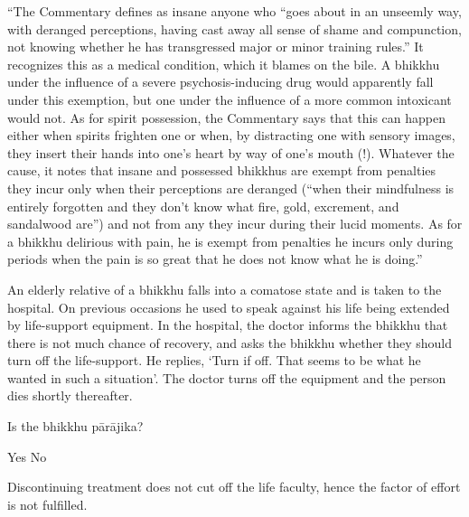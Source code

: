 \begin{exam}{\autoExamName}
\begin{problem}
\begin{solution}
    ``The Commentary defines as insane anyone who “goes about in an unseemly way, with deranged perceptions, having cast away all sense of shame and compunction, not knowing whether he has transgressed major or minor training rules.” It recognizes this as a medical condition, which it blames on the bile. A bhikkhu under the influence of a severe psychosis-inducing drug would apparently fall under this exemption, but one under the influence of a more common intoxicant would not. As for spirit possession, the Commentary says that this can happen either when spirits frighten one or when, by distracting one with sensory images, they insert their hands into one’s heart by way of one’s mouth (!). Whatever the cause, it notes that insane and possessed bhikkhus are exempt from penalties they incur only when their perceptions are deranged (“when their mindfulness is entirely forgotten and they don’t know what fire, gold, excrement, and sandalwood are”) and not from any they incur during their lucid moments. As for a bhikkhu delirious with pain, he is exempt from penalties he incurs only during periods when the pain is so great that he does not know what he is doing.''

  \end{solution}

\end{problem}

\problemDivide

\begin{problem}

  An elderly relative of a bhikkhu falls into a comatose state and is taken to the hospital.
  On previous occasions he used to speak against his life being extended by life-support equipment.
  In the hospital, the doctor informs the bhikkhu that there is not much chance of recovery, and asks the bhikkhu whether they should turn off the life-support.
  He replies, `Turn if off. That seems to be what he wanted in such a situation'.
  The doctor turns off the equipment and the person dies shortly thereafter.

  \bigskip

  Is the bhikkhu pārājika?

  \begin{answers}{2}
    \bChoices
     Yes\eAns
     No\eAns
    \eChoices
  \end{answers}

  \begin{solution}
    Discontinuing treatment does not cut off the life faculty, hence the factor of effort is not fulfilled.
  \end{solution}


\end{problem}
\end{exam}
